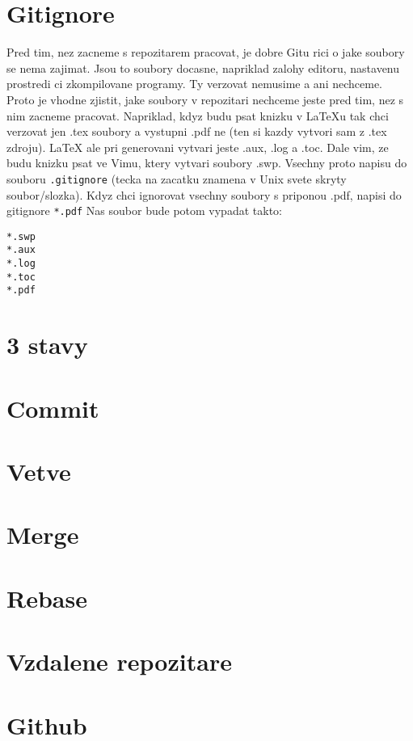 \documentclass[12pt,a5paper]{article}
\begin{document}
\section{Gitignore}

Pred tim, nez zacneme s repozitarem pracovat, je dobre Gitu rici o jake soubory se nema zajimat. Jsou to soubory docasne, napriklad zalohy editoru, nastavenu prostredi ci zkompilovane programy. Ty verzovat nemusime a ani nechceme. Proto je vhodne zjistit, jake soubory v repozitari nechceme jeste pred tim, nez s nim zacneme pracovat. Napriklad, kdyz budu psat knizku v LaTeXu tak chci verzovat jen .tex soubory a vystupni .pdf ne (ten si kazdy vytvori sam z .tex zdroju). LaTeX ale pri generovani vytvari jeste .aux, .log a .toc. Dale vim, ze budu knizku psat ve Vimu, ktery vytvari soubory .swp. Vsechny proto napisu do souboru \lstinline|.gitignore| (tecka na zacatku znamena v Unix svete skryty soubor/slozka). Kdyz chci ignorovat vsechny soubory s priponou .pdf, napisi do gitignore \lstinline|*.pdf| Nas soubor bude potom vypadat takto: 

\begin{lstlisting}
*.swp
*.aux
*.log
*.toc
*.pdf

\end{lstlisting}


\section{3 stavy}
\section{Commit}
\section{Vetve}
\section{Merge}
\section{Rebase}
\section{Vzdalene repozitare}
\section{Github}
\end{document}
